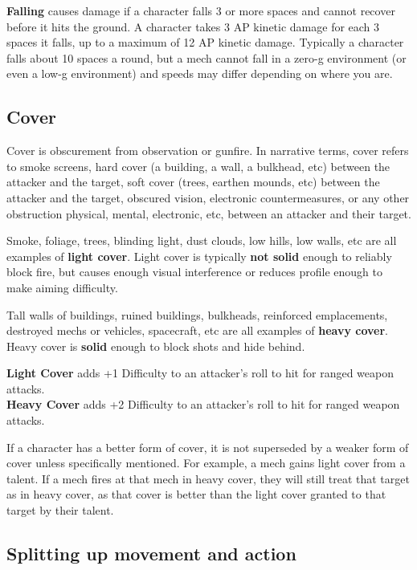 \textbf{Falling} causes damage if a character falls 3 or more spaces and cannot recover before it hits the ground. A character takes 3 AP kinetic damage for each 3 spaces it falls, up to a maximum of 12 AP kinetic damage. Typically a character falls about 10 spaces a round, but a mech cannot fall in a zero-g environment (or even a low-g environment) and speeds may differ depending on where you are.

\subsection{Cover}

Cover is obscurement from observation or gunfire. In narrative terms, cover refers to smoke screens, hard cover (a building, a wall, a bulkhead, etc) between the attacker and the target, soft cover (trees, earthen mounds, etc) between the attacker and the target, obscured vision, electronic countermeasures, or any other obstruction physical, mental, electronic, etc, between an attacker and their target.

Smoke, foliage, trees, blinding light, dust clouds, low hills, low walls, etc are all examples of \textbf{light cover}. Light cover is typically \textbf{not solid} enough to reliably block fire, but causes enough visual interference or reduces profile enough to make aiming difficulty.

Tall walls of buildings, ruined buildings, bulkheads, reinforced emplacements, destroyed mechs or vehicles, spacecraft, etc are all examples of \textbf{heavy cover}. Heavy cover is \textbf{solid} enough to block shots and hide behind.

\textbf{Light Cover} adds +1 Difficulty to an attacker's roll to hit for ranged weapon attacks.\\
\textbf{Heavy Cover} adds +2 Difficulty to an attacker's roll to hit for ranged weapon attacks.

If a character has a better form of cover, it is not superseded by a weaker form of cover unless specifically mentioned. For example, a mech gains light cover from a talent. If a mech fires at that mech in heavy cover, they will still treat that target as in heavy cover, as that cover is better than the light cover granted to that target by their talent.


\subsection{Splitting up movement and action}

